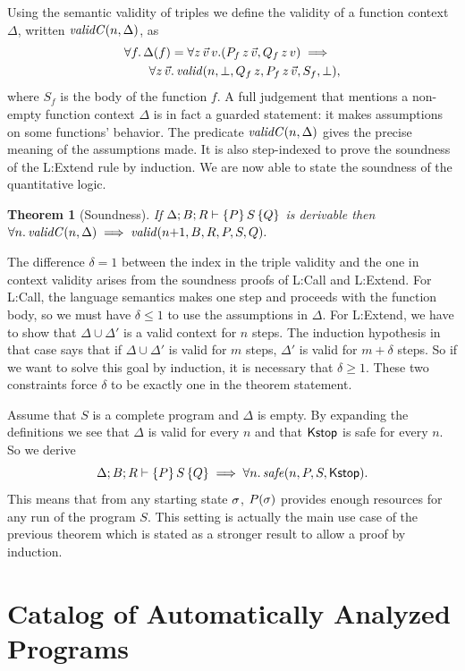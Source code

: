 \documentclass{sigplanconf}
\newtheorem{theorem}{Theorem}
\begin{document}
{Using the semantic validity of triples we define the validity
of a function context $\Delta$, written $\mathit{validC}(n,\Delta)$, as
\begin{align*}
  &\forall f .\, \Delta(f) =
    \forall z \, \vec v \, v .(P_f \, z \, \vec v, Q_f \, z \, v)
    \implies \\
  &\qquad \forall z \, \vec v .\,
  \mathit{valid}(n,\bot,Q_f \, z,P_f \, z \, \vec v,S_f,\bot) ,
\end{align*}
where $S_f$ is the body of the function $f$. A full
judgement that mentions a non-empty function context
$\Delta$ is in fact a guarded statement: it makes
assumptions on some functions' behavior.  The predicate
$\mathit{validC}(n,\Delta)$ gives the precise meaning of the
assumptions made.  It is also step-indexed to prove the
soundness of the {\sc L:Extend} rule by induction.
%
We are now able to state the soundness of the quantitative logic.
%
\begin{theorem}[Soundness]
  If $\Delta; B; R \vdash \{P\}\, S\, \{Q\}$ is derivable then
  $
    \forall n .\, \mathit{validC}(n,\Delta)
      \implies \mathit{valid}(n {+} 1,B,R,P,S,Q).
  $
\end{theorem}
%
\noindent
The difference $\delta = 1$ between the index in the triple
validity and the one in context validity arises from
the soundness proofs of {\sc L:Call} and {\sc L:Extend}.  For
{\sc L:Call}, the language semantics makes one step and
proceeds with the function body, so we must have
$\delta \le 1$ to use the assumptions in $\Delta$.
For {\sc L:Extend}, we have to show that $\Delta \cup \Delta'$
is a valid context for $n$ steps.  The induction hypothesis
in that case says that if $\Delta \cup \Delta'$ is valid
for $m$ steps, $\Delta'$ is valid for $m+\delta$ steps.
So if we want to solve this goal by induction, it is
necessary that $\delta \ge 1$.  These two constraints force
$\delta$ to be exactly one in the theorem statement.

Assume that $S$ is a complete program and $\Delta$ is empty.  By
expanding the definitions we see that $\Delta$ is valid
for every $n$ and that $\mathsf{Kstop}$ is safe for every $n$. So
we derive
$$
\Delta; B; R \vdash \{P\}\, S\, \{Q\} \implies   \forall n .\, \mathit{safe}(n,P,S,\mathsf{Kstop}).
$$
This means that from any starting state $\sigma$, $P(\sigma)$
provides enough resources for any run of the program $S$.  This
setting is actually the main use case of the previous theorem
which is stated as a stronger result to allow a proof by
induction.




\section{Catalog of Automatically Analyzed Programs}
\label{app:cat}

}
\end{document}
